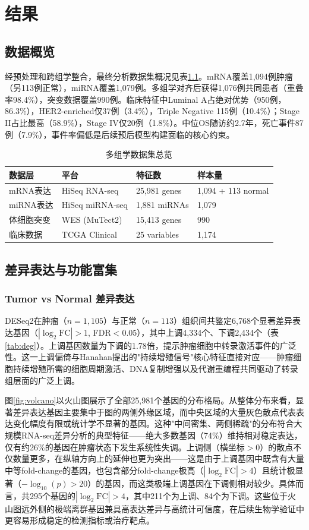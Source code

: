 \documentclass[12pt,a4paper,openany]{ctexbook}
\begin{document}
\chapter{结果}

\section{数据概览}
经预处理和跨组学整合，最终分析数据集概况见表\ref{tab:data}。mRNA覆盖1,094例肿瘤（另113例正常），miRNA覆盖1,079例。多组学对齐后获得1,076例共同患者（重叠率98.4\%），突变数据覆盖990例。临床特征中Luminal A占绝对优势（950例，86.3\%），HER2-enriched仅37例（3.4\%），Triple Negative 115例（10.4\%）；Stage II占比最高（58.9\%），Stage IV仅20例（1.8\%）。中位OS随访约2.7年，死亡事件87例（7.9\%），事件率偏低是后续预后模型构建面临的核心约束。

\begin{table}[H]
\centering\caption{多组学数据集总览}\label{tab:data}
\begin{tabular}{llll}\toprule
数据层 & 平台 & 特征数 & 样本量 \\\midrule
mRNA表达 & HiSeq RNA-seq & 25,981 genes & 1,094 + 113 normal \\
miRNA表达 & HiSeq miRNA-seq & 1,881 miRNAs & 1,079 \\
体细胞突变 & WES (MuTect2) & 15,413 genes & 990 \\
临床数据 & TCGA Clinical & 25 variables & 1,174 \\\bottomrule
\end{tabular}
\end{table}

\section{差异表达与功能富集}

\subsection{Tumor vs Normal 差异表达}
DESeq2在肿瘤（$n=1,105$）与正常（$n=113$）组织间共鉴定6,768个显著差异表达基因（$|\log_2\text{FC}|>1$, FDR$<0.05$），其中上调4,334个、下调2,434个（表\ref{tab:deg}）。上调基因数量为下调的1.78倍，提示肿瘤细胞中转录激活事件的广泛性。这一上调偏倚与Hanahan\cite{hanahan2011hallmarks}提出的"持续增殖信号"核心特征直接对应——肿瘤细胞持续增殖所需的细胞周期激活、DNA复制增强以及代谢重编程共同驱动了转录组层面的广泛上调。

图\ref{fig:volcano}以火山图展示了全部25,981个基因的分布格局。从整体分布来看，显著差异表达基因主要集中于图的两侧外缘区域，而中央区域的大量灰色散点代表表达变化幅度有限或统计学不显著的基因。这种"中间密集、两侧稀疏"的分布符合大规模RNA-seq差异分析的典型特征——绝大多数基因（74\%）维持相对稳定表达，仅有约26\%的基因在肿瘤状态下发生系统性失调。上调侧（横坐标$>$0）的散点不仅数量更多，在纵轴方向上的延伸也更为突出——这是由于上调基因中既含有大量中等fold-change的基因，也包含部分fold-change极高（$|\log_2\text{FC}|>4$）且统计极显著（$-\log_{10}(p)>20$）的基因，而这类极端上调基因在下调侧相对较少。具体而言，共295个基因的$|\log_2\text{FC}|>4$，其中211个为上调、84个为下调。这些位于火山图远外侧的极端离群基因兼具高表达差异与高统计可信度，在后续生物学验证中更容易形成稳定的检测指标或治疗靶点。
\end{document}

